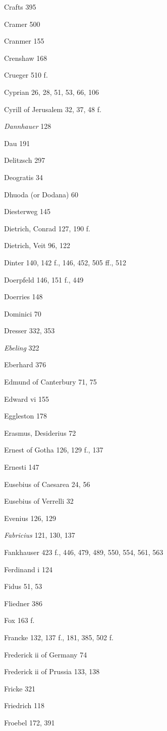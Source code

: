 Crafts 395

Cramer 500

Cranmer 155

Crenshaw 168

Crueger 510 f.

Cyprian 26, 28, 51, 53, 66, 106

Cyrill of Jerusalem 32, 37, 48 f.

\emph{Dannhauer} 128

Dau 191

Delitzsch 297

Deogratis 34

Dhuoda (or Dodana) 60

Diesterweg 145

Dietrich, Conrad 127, 190 f.

Dietrich, Veit 96, 122

Dinter 140, 142 f., 146, 452, 505 ff., 512

Doerpfeld 146, 151 f., 449

Doerries 148

Dominici 70

Dresser 332, 353

\emph{Ebeling} 322

Eberhard 376

Edmund of Canterbury 71, 75

Edward vi 155

Eggleston 178

Erasmus, Desiderius 72

Ernest of Gotha 126, 129 f., 137

Ernesti 147

Eusebius of Caesarea 24, 56

Eusebius of Verrelli 32

Evenius 126, 129

\emph{Fabricius} 121, 130, 137

Fankhauser 423 f., 446, 479, 489, 550, 554, 561, 563

Ferdinand i 124

Fidus 51, 53

Fliedner 386

Fox 163 f.

Francke 132, 137 f., 181, 385, 502 f.

Frederick ii of Germany 74

Frederick ii of Prussia 133, 138

Fricke 321

Friedrich 118

Froebel 172, 391

